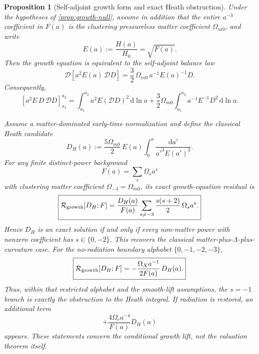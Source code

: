 \documentclass[aps,prd,preprint,onecolumn,nofootinbib,superscriptaddress,showkeys]{revtex4-2}
\numberwithin{equation}{section}
\theoremstyle{definition}
\theoremstyle{plain}
\newtheorem{proposition}{Proposition}[section]
\newcommand{\dd}{\mathrm d}
\newcommand{\Dil}{\mathscr D}
\begin{document}
\begin{proposition}[Self-adjoint growth form and exact Heath obstruction]\label{prop:growth-selfadjoint}
Under the hypotheses of \cref{prop:growth-null}, assume in addition that the entire \(a^{-3}\) coefficient in \(F(a)\) is the clustering pressureless matter coefficient \(\Omega_{m0}\), and write
\[
E(a):=\frac{H(a)}{H_0}=\sqrt{F(a)}.
\]
Then the growth equation is equivalent to the self-adjoint balance law
\begin{equation}
\boxed{
\Dil\!\left[a^2E(a)\,\Dil D\right]
=
\frac32\,\Omega_{m0}\,a^{-1}E(a)^{-1}D.
}
\label{eq:growth-selfadjoint}
\end{equation}
Consequently,
\begin{equation}
\boxed{
\left[a^2E\,D\,\Dil D\right]_{a_1}^{a_2}
=
\int_{a_1}^{a_2}a^2E(\Dil D)^2\,\dd\ln a
+
\frac32\Omega_{m0}
\int_{a_1}^{a_2}a^{-1}E^{-1}D^2\,\dd\ln a.
}
\label{eq:growth-energy}
\end{equation}

Assume a matter-dominated early-time normalization and define the classical Heath candidate \cite{Heath1977}
\begin{equation}
D_H(a)
:=
\frac{5\Omega_{m0}}{2}\,
E(a)\int_0^a\frac{\dd a'}{a'^3E(a')^3}.
\label{eq:heath-candidate}
\end{equation}
For any finite distinct-power background
\begin{equation}
F(a)=\sum_s\Omega_s a^s
\end{equation}
with clustering matter coefficient \(\Omega_{-3}=\Omega_{m0}\), its exact growth-equation residual is
\begin{equation}
\boxed{
\mathcal R_{\rm growth}[D_H;F]
=
\frac{D_H(a)}{F(a)}
\sum_{s\ne-3}\frac{s(s+2)}{2}\,\Omega_s a^s.
}
\label{eq:heath-general-obstruction}
\end{equation}
Hence \(D_H\) is an exact solution if and only if every non-matter power with nonzero coefficient has \(s\in\{0,-2\}\).  This recovers the classical matter-plus-\(\Lambda\)-plus-curvature case.  For the no-radiation boundary alphabet \(\{0,-1,-2,-3\}\),
\begin{equation}
\boxed{
\mathcal R_{\rm growth}[D_H;F]
=
-\frac{\Omega_Xa^{-1}}{2F(a)}\,D_H(a).
}
\label{eq:heath-x-obstruction}
\end{equation}
Thus, within that restricted alphabet and the smooth-lift assumptions, the \(s=-1\) branch is exactly the obstruction to the Heath integral.  If radiation is restored, an additional term
\[
+\frac{4\Omega_ra^{-4}}{F(a)}D_H(a)
\]
appears.  These statements concern the conditional growth lift, not the valuation theorem itself.
\end{proposition}
\end{document}

